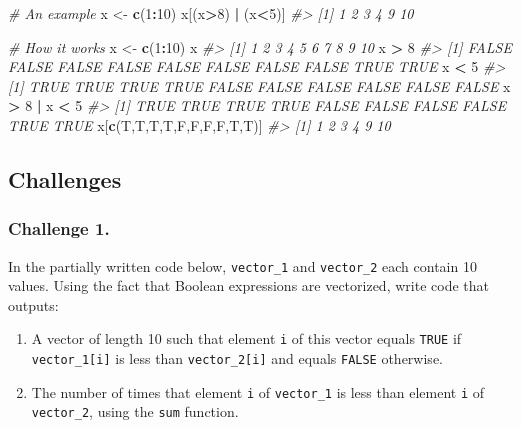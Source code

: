 \documentclass[]{book}
\newenvironment{Shaded}{\begin{snugshade}}{\end{snugshade}}
\newcommand{\KeywordTok}[1]{\textcolor[rgb]{0.13,0.29,0.53}{\textbf{#1}}}
\newcommand{\DecValTok}[1]{\textcolor[rgb]{0.00,0.00,0.81}{#1}}
\newcommand{\StringTok}[1]{\textcolor[rgb]{0.31,0.60,0.02}{#1}}
\newcommand{\CommentTok}[1]{\textcolor[rgb]{0.56,0.35,0.01}{\textit{#1}}}
\newcommand{\OperatorTok}[1]{\textcolor[rgb]{0.81,0.36,0.00}{\textbf{#1}}}
\newcommand{\NormalTok}[1]{#1}
\providecommand{\tightlist}{%
  \setlength{\itemsep}{0pt}\setlength{\parskip}{0pt}}
\begin{document}
\begin{Shaded}
\begin{Highlighting}[]
\CommentTok{# An example}
\NormalTok{x <-}\StringTok{ }\KeywordTok{c}\NormalTok{(}\DecValTok{1}\OperatorTok{:}\DecValTok{10}\NormalTok{)}
\NormalTok{x[(x}\OperatorTok{>}\DecValTok{8}\NormalTok{) }\OperatorTok{|}\StringTok{ }\NormalTok{(x}\OperatorTok{<}\DecValTok{5}\NormalTok{)]}
\CommentTok{#> [1]  1  2  3  4  9 10}

\CommentTok{# How it works}
\NormalTok{x <-}\StringTok{ }\KeywordTok{c}\NormalTok{(}\DecValTok{1}\OperatorTok{:}\DecValTok{10}\NormalTok{)}
\NormalTok{x}
\CommentTok{#>  [1]  1  2  3  4  5  6  7  8  9 10}
\NormalTok{x }\OperatorTok{>}\StringTok{ }\DecValTok{8}
\CommentTok{#>  [1] FALSE FALSE FALSE FALSE FALSE FALSE FALSE FALSE  TRUE  TRUE}
\NormalTok{x }\OperatorTok{<}\StringTok{ }\DecValTok{5}
\CommentTok{#>  [1]  TRUE  TRUE  TRUE  TRUE FALSE FALSE FALSE FALSE FALSE FALSE}
\NormalTok{x }\OperatorTok{>}\StringTok{ }\DecValTok{8} \OperatorTok{|}\StringTok{ }\NormalTok{x }\OperatorTok{<}\StringTok{ }\DecValTok{5}
\CommentTok{#>  [1]  TRUE  TRUE  TRUE  TRUE FALSE FALSE FALSE FALSE  TRUE  TRUE}
\NormalTok{x[}\KeywordTok{c}\NormalTok{(T,T,T,T,F,F,F,F,T,T)]}
\CommentTok{#> [1]  1  2  3  4  9 10}
\end{Highlighting}
\end{Shaded}

\subsection{Challenges}\label{challenges-4}

\subsubsection*{Challenge 1.}\label{challenge-1.-1}

In the partially written code below, \texttt{vector\_1} and
\texttt{vector\_2} each contain 10 values. Using the fact that Boolean
expressions are vectorized, write code that outputs:

\begin{enumerate}
\def\labelenumi{\arabic{enumi}.}
\tightlist
\item
  A vector of length 10 such that element \texttt{i} of this vector
  equals \texttt{TRUE} if \texttt{vector\_1{[}i{]}} is less than
  \texttt{vector\_2{[}i{]}} and equals \texttt{FALSE} otherwise.
\item
  The number of times that element \texttt{i} of \texttt{vector\_1} is
  less than element \texttt{i} of \texttt{vector\_2}, using the
  \texttt{sum} function.
\end{enumerate}
\end{document}
